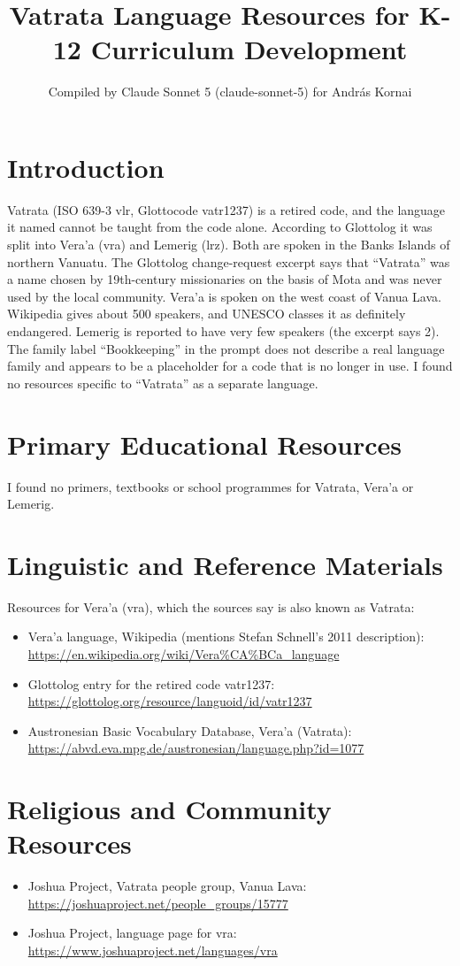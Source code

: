 \documentclass[12pt]{article}
\title{Vatrata Language Resources for K-12 Curriculum Development}
\author{Compiled by Claude Sonnet 5 (claude-sonnet-5) for Andr\'as Kornai}
\date{}
\begin{document}
\maketitle

\section{Introduction}
Vatrata (ISO 639-3 vlr, Glottocode vatr1237) is a retired code, and the language it named cannot be taught from the code alone. According to Glottolog it was split into Vera'a (vra) and Lemerig (lrz). Both are spoken in the Banks Islands of northern Vanuatu. The Glottolog change-request excerpt says that ``Vatrata'' was a name chosen by 19th-century missionaries on the basis of Mota and was never used by the local community. Vera'a is spoken on the west coast of Vanua Lava. Wikipedia gives about 500 speakers, and UNESCO classes it as definitely endangered. Lemerig is reported to have very few speakers (the excerpt says 2). The family label ``Bookkeeping'' in the prompt does not describe a real language family and appears to be a placeholder for a code that is no longer in use. I found no resources specific to ``Vatrata'' as a separate language.

\section{Primary Educational Resources}
I found no primers, textbooks or school programmes for Vatrata, Vera'a or Lemerig.

\section{Linguistic and Reference Materials}
Resources for Vera'a (vra), which the sources say is also known as Vatrata:
\begin{itemize}
\item Vera'a language, Wikipedia (mentions Stefan Schnell's 2011 description): \url{https://en.wikipedia.org/wiki/Vera%CA%BCa_language}
\item Glottolog entry for the retired code vatr1237: \url{https://glottolog.org/resource/languoid/id/vatr1237}
\item Austronesian Basic Vocabulary Database, Vera'a (Vatrata): \url{https://abvd.eva.mpg.de/austronesian/language.php?id=1077}
\end{itemize}

\section{Religious and Community Resources}
\begin{itemize}
\item Joshua Project, Vatrata people group, Vanua Lava: \url{https://joshuaproject.net/people_groups/15777}
\item Joshua Project, language page for vra: \url{https://www.joshuaproject.net/languages/vra}
\end{itemize}
\end{document}
